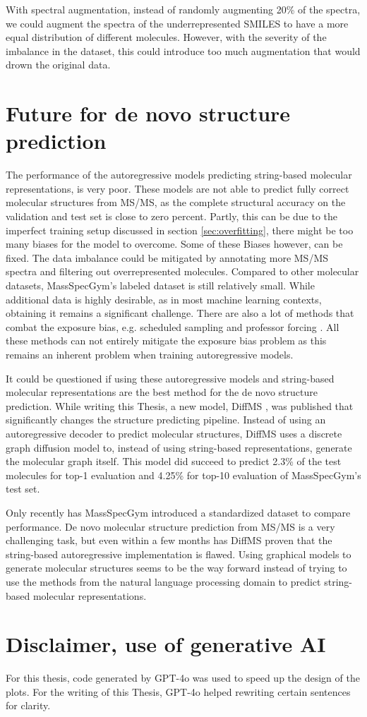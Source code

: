 With spectral augmentation, instead of randomly augmenting 20\% of the spectra, we could augment the spectra of the underrepresented SMILES to have a more equal distribution of different molecules.
However, with the severity of the imbalance in the dataset, this could introduce too much augmentation that would drown the original data.

\section{Future for de novo structure prediction}

The performance of the autoregressive models predicting string-based molecular representations, is very poor.
These models are not able to predict fully correct molecular structures from \ac{MS/MS}, as the complete structural accuracy on the validation and test set is close to zero percent.
Partly, this can be due to the imperfect training setup discussed in section \ref{sec:overfitting}, there might be too many biases for the model to overcome.
Some of these Biases however, can be fixed.
The data imbalance could be mitigated by annotating more \ac{MS/MS} spectra and filtering out overrepresented molecules.
Compared to other molecular datasets, MassSpecGym's labeled dataset is still relatively small.
While additional data is highly desirable, as in most machine learning contexts, obtaining it remains a significant challenge.
There are also a lot of methods that combat the exposure bias, e.g. scheduled sampling \cite{bengio2015scheduled} and professor forcing \cite{lamb2016professor}.
All these methods can not entirely mitigate the exposure bias problem as this remains an inherent problem when training autoregressive models.

It could be questioned if using these autoregressive models and string-based molecular representations are the best method for the de novo structure prediction.
While writing this Thesis, a new model, DiffMS \cite{bohde2025diffms}, was published that significantly changes the structure predicting pipeline.
Instead of using an autoregressive decoder to predict molecular structures, DiffMS uses a discrete graph diffusion model to, instead of using string-based representations, generate the molecular graph itself.
This model did succeed to predict 2.3\% of the test molecules for top-1 evaluation and 4.25\% for top-10 evaluation of MassSpecGym's test set.

Only recently has MassSpecGym introduced a standardized dataset to compare performance. De novo molecular structure prediction from \ac{MS/MS} is a very challenging task,
but even within a few months has DiffMS proven that the string-based autoregressive implementation is flawed.
Using graphical models to generate molecular structures seems to be the way forward instead of trying to use the methods from the natural language processing domain to predict string-based molecular representations.

\section*{Disclaimer, use of generative AI}

For this thesis, code generated by GPT-4o was used to speed up the design of the plots.
For the writing of this Thesis, GPT-4o helped rewriting certain sentences for clarity.